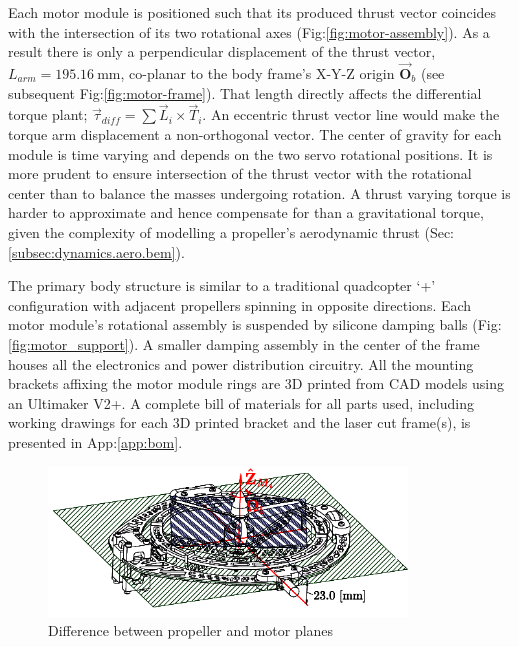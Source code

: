 Each motor module is positioned such that its produced thrust vector coincides with the intersection of its two rotational axes (Fig:\ref{fig:motor-assembly}). As a result there is only a perpendicular displacement of the thrust vector, $L_{arm}=195.16~\text{mm}$, co-planar to the body frame's X-Y-Z origin $\vec{\mathbf{O}}_b$ (see subsequent Fig:\ref{fig:motor-frame}). That length directly affects the differential torque plant; $\vec{\tau}_{diff}=\sum\vec{L}_i\times\vec{T}_i$. An eccentric thrust vector line would make the torque arm displacement a non-orthogonal vector. The center of gravity for each module is time varying and depends on the two servo rotational positions. It is more prudent to ensure intersection of the thrust vector with the rotational center than to balance the masses undergoing rotation. A thrust varying torque is harder to approximate and hence compensate for than a gravitational torque, given the complexity of modelling a propeller's aerodynamic thrust (Sec:\ref{subsec:dynamics.aero.bem}).
\par
The primary body structure is similar to a traditional quadcopter `+' configuration with adjacent propellers spinning in opposite directions. Each motor module's rotational assembly is suspended by silicone damping balls (Fig:\ref{fig:motor_support}). A smaller damping assembly in the center of the frame houses all the electronics and power distribution circuitry. All the mounting brackets affixing the motor module rings are 3D printed from CAD models using an Ultimaker V2+\cite{ultimaker}. A complete bill of materials for all parts used, including working drawings for each 3D printed bracket and the laser cut frame(s), is presented in App:\ref{app:bom}.
\par
\begin{figure}[hbtp]
\centering
\includegraphics[width=0.85\textwidth]{figs/motor-prop}
\vspace{-10pt}
\caption{Difference between propeller and motor planes}
\label{fig:motor_prop}
\vspace{-15pt}
\end{figure}
